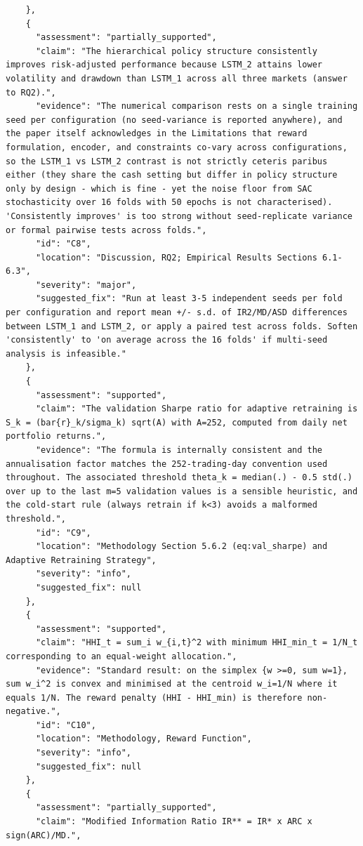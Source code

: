 \documentclass[11pt]{article}
\begin{document}
\begin{verbatim}
    },
    {
      "assessment": "partially_supported",
      "claim": "The hierarchical policy structure consistently improves risk-adjusted performance because LSTM_2 attains lower volatility and drawdown than LSTM_1 across all three markets (answer to RQ2).",
      "evidence": "The numerical comparison rests on a single training seed per configuration (no seed-variance is reported anywhere), and the paper itself acknowledges in the Limitations that reward formulation, encoder, and constraints co-vary across configurations, so the LSTM_1 vs LSTM_2 contrast is not strictly ceteris paribus either (they share the cash setting but differ in policy structure only by design - which is fine - yet the noise floor from SAC stochasticity over 16 folds with 50 epochs is not characterised). 'Consistently improves' is too strong without seed-replicate variance or formal pairwise tests across folds.",
      "id": "C8",
      "location": "Discussion, RQ2; Empirical Results Sections 6.1-6.3",
      "severity": "major",
      "suggested_fix": "Run at least 3-5 independent seeds per fold per configuration and report mean +/- s.d. of IR2/MD/ASD differences between LSTM_1 and LSTM_2, or apply a paired test across folds. Soften 'consistently' to 'on average across the 16 folds' if multi-seed analysis is infeasible."
    },
    {
      "assessment": "supported",
      "claim": "The validation Sharpe ratio for adaptive retraining is S_k = (bar{r}_k/sigma_k) sqrt(A) with A=252, computed from daily net portfolio returns.",
      "evidence": "The formula is internally consistent and the annualisation factor matches the 252-trading-day convention used throughout. The associated threshold theta_k = median(.) - 0.5 std(.) over up to the last m=5 validation values is a sensible heuristic, and the cold-start rule (always retrain if k<3) avoids a malformed threshold.",
      "id": "C9",
      "location": "Methodology Section 5.6.2 (eq:val_sharpe) and Adaptive Retraining Strategy",
      "severity": "info",
      "suggested_fix": null
    },
    {
      "assessment": "supported",
      "claim": "HHI_t = sum_i w_{i,t}^2 with minimum HHI_min_t = 1/N_t corresponding to an equal-weight allocation.",
      "evidence": "Standard result: on the simplex {w >=0, sum w=1}, sum w_i^2 is convex and minimised at the centroid w_i=1/N where it equals 1/N. The reward penalty (HHI - HHI_min) is therefore non-negative.",
      "id": "C10",
      "location": "Methodology, Reward Function",
      "severity": "info",
      "suggested_fix": null
    },
    {
      "assessment": "partially_supported",
      "claim": "Modified Information Ratio IR** = IR* x ARC x sign(ARC)/MD.",

\end{verbatim}
\end{document}
